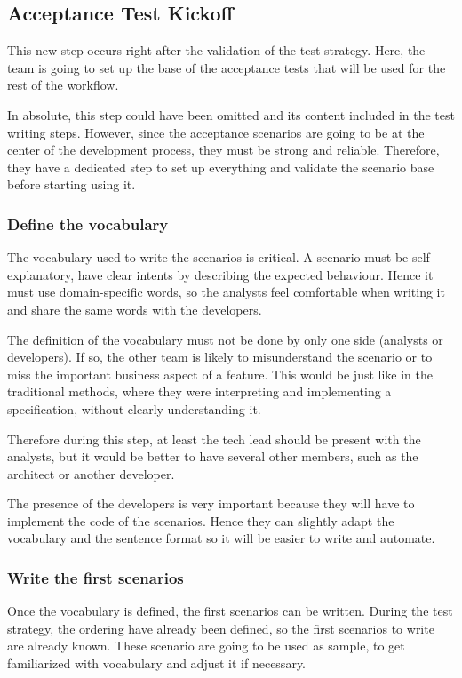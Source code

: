 \subsection{Acceptance Test Kickoff}\label{subsec:acceptance-test-kickoff}
This new step occurs right after the validation of the test strategy.
Here, the team is going to set up the base of the acceptance tests that will
be used for the rest of the workflow.

In absolute, this step could have been omitted and its content included in
the test writing steps.
However, since the acceptance scenarios are going to be at the center of the
development process, they must be strong and reliable.
Therefore, they have a dedicated step to set up everything and validate the
scenario base before starting using it.

\subsubsection{Define the vocabulary}
The vocabulary used to write the scenarios is critical.
A scenario must be self explanatory, have clear intents by describing the
expected behaviour.
Hence it must use domain-specific words, so the analysts feel comfortable
when writing it and share the same words with the developers.

The definition of the vocabulary must not be done by only one side (analysts
or developers).
If so, the other team is likely to misunderstand the scenario or to miss the
important business aspect of a feature.
This would be just like in the traditional methods, where they were
interpreting and implementing a specification, without clearly understanding it.

Therefore during this step, at least the tech lead should be present with the
analysts, but it would be better to have several other members, such as the
architect or another developer.

The presence of the developers is very important because they will have to
implement the code of the scenarios.
Hence they can slightly adapt the vocabulary and the sentence format so it
will be easier to write and automate.

\subsubsection{Write the first scenarios}
Once the vocabulary is defined, the first scenarios can be written.
During the test strategy, the ordering have already been defined, so the
first scenarios to write are already known.
These scenario are going to be used as sample, to get familiarized
with vocabulary and adjust it if necessary.

